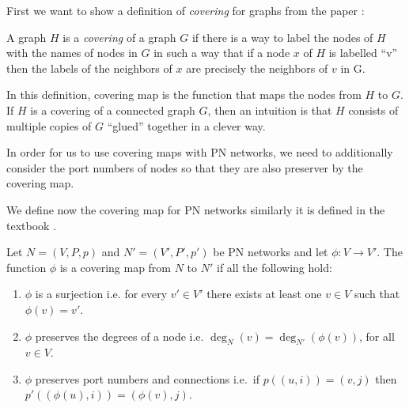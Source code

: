 First we want to show a definition of \emph{covering} for graphs from the paper
\cite{DBLP:conf/stoc/Angluin80}:
\begin{displayquote}
A graph $H$ is a \emph{covering} of a graph $G$ if there is a way to label the nodes of $H$ with the names of nodes in $G$ in such a way that if a node $x$ of $H$ is labelled ``v'' then the labels of the neighbors of $x$ are precisely the neighbors of $v$ in G.
\end{displayquote}
In this definition, covering map is the function that maps the nodes from $H$ to $G$.
If $H$ is a covering of a connected graph $G$, then an intuition is that $H$ consists of multiple copies of $G$ ``glued'' together in a clever way.


In order for us to use covering maps with PN networks, we need to additionally consider the port numbers of nodes so that they are also preserver by the covering map.

We define now the covering map for PN networks similarly it is defined in the textbook \cite{HirvonenSuomelaDistAlg2020}.

\begin{definition} \label{def:covering_map}
  Let $N=(V, P, p)$ and $N'=(V', P', p')$ be PN networks and let $\phi\colon V \rightarrow V'$.
  The function $\phi$ is a covering map from $N$ to $N'$ if all the following hold:
  \begin{enumerate}
    \item $\phi$ is a surjection i.e. for every $v' \in V'$ there exists at least one $v \in V$ such that $\phi(v) = v'$.
    \item $\phi$ preserves the degrees of a node i.e. $\deg_N(v) = \deg_{N'}(\phi(v))$, for all $v \in V$.
    \item $\phi$ preserves port numbers and connections i.e.\ if $p((u, i)) = (v, j)$ then $p'((\phi(u), i)) = (\phi(v), j)$.
  \end{enumerate}
\end{definition}

